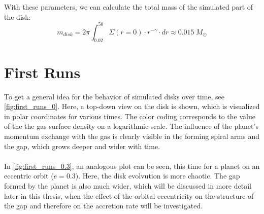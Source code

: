           With these parameters, we can calculate the total mass of the 
          simulated part of the disk:
          \begin{equation}
            m_{disk}=2\pi\int_{0.02}^{50}\Sigma(r=0)\cdot r^{-\gamma}\cdot 
            dr\approx0.015\ M_\odot
            \label{}
          \end{equation}

  \clearpage
  \section{First Runs}
    To get a general idea for the behavior of simulated disks over time,
    see \autoref{fig:first_runs_0}. Here, a top-down view on 
    the disk is shown, which is visualized in polar coordinates for various 
    times. The color coding corresponds to the value of the the gas surface 
    density on a logarithmic scale.
    The influence of the planet's momentum exchange with the gas is clearly 
    visible in the forming spiral arms and the gap, which grows deeper and wider 
    with time. \\
    \\
    In \autoref{fig:first_runs_0.3}, an analogous plot can be seen, 
    this time for a planet on an eccentric orbit ($e=0.3$). Here, the disk 
    evolvution is more chaotic. The gap formed by the planet is also much wider, 
    which will be discussed in more detail later in this thesis, 
    when the effect of the orbital eccentricity on the structure of the gap and 
    therefore on the accretion rate will be investigated.
